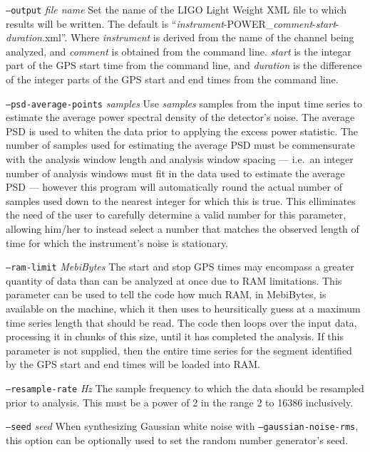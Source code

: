 \documentclass[10pt]{article}
\newcommand{\option}[1]{\texttt{#1}}
\newcommand{\parm}[1]{\textit{#1}}
\newenvironment{entry}%
{\begin{list}{}{\renewcommand{\makelabel}[1]%
{\parbox[b]{\labelwidth}{\makebox[0pt][l]{\textbf{##1}}\\}}%
\setlength{\labelwidth}{1em}%
\setlength{\labelsep}{1em}%
\setlength{\leftmargin}{2em}%
\setlength{\topsep}{\medskipamount}%
\setlength{\itemsep}{\medskipamount}%
\setlength{\parsep}{\medskipamount}%
\setlength{\listparindent}{0pt}}}
{\end{list}}
\begin{document}
\begin{entry}
\begin{entry}
\item[\option{--output} \parm{file name}]
Set the name of the LIGO Light Weight XML file to which results will be
written.  The default is
``\parm{instrument}-POWER\_\parm{comment}-\parm{start}-\parm{duration}.xml''.
Where \parm{instrument} is derived from the name of the channel being
analyzed, and \parm{comment} is obtained from the command line.
\parm{start} is the integar part of the GPS start time from the command
line, and \parm{duration} is the difference of the integer parts of the
GPS start and end times from the command line.

\item[\option{--psd-average-points} \parm{samples}]
Use \parm{samples} samples from the input time series to estimate the
average power spectral density of the detector's noise.  The average PSD is
used to whiten the data prior to applying the excess power statistic.  The
number of samples used for estimating the average PSD must be commensurate
with the analysis window length and analysis window spacing --- i.e.\ an
integer number of analysis windows must fit in the data used to estimate
the average PSD --- however this program will automatically round the
actual number of samples used down to the nearest integer for which this is
true.  This elliminates the need of the user to carefully determine a valid
number for this parameter, allowing him/her to instead select a number that
matches the observed length of time for which the instrument's noise is
stationary.

\item[\option{--ram-limit} \parm{MebiBytes}]
The start and stop GPS times may encompass a greater quantity of data than
can be analyzed at once due to RAM limitations.  This parameter can be used
to tell the code how much RAM, in MebiBytes, is available on the machine,
which it then uses to heursitically guess at a maximum time series length
that should be read.  The code then loops over the input data, processing
it in chunks of this size, until it has completed the analysis.  If this
parameter is not supplied, then the entire time series for the segment
identified by the GPS start and end times will be loaded into RAM.

\item[\option{--resample-rate} \parm{Hz}]
The sample frequency to which the data should be resampled prior to
analysis.  This must be a power of 2 in the range \unit{2}{\hertz} to
\unit{16386}{\hertz} inclusively.

\item[\option{--seed} \parm{seed}]
When synthesizing Gaussian white noise with \option{--gaussian-noise-rms},
this option can be optionally used to set the random number generator's
seed.


\end{entry}
\end{entry}
\end{document}
